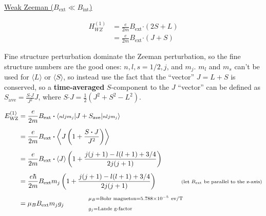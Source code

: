 \documentclass[12pt]{article}
\newcommand*{\dotP}{\boldsymbol \cdot}	%
\begin{document}
\vspace{5pt} \noindent
\underline{Weak Zeeman (\(B_\text{ext} \ll B_\text{int}\))}

\vspace{-10pt}
\begin{align*}
    H_{WZ}^{(1)} &= \frac{e}{2m} B_\text{ext} \dotP (2S + L)  \\[5pt]
    &= \frac{e}{2m} B_\text{ext} \dotP ( J + S )
\end{align*}

\vspace{5pt}\noindent
Fine structure perturbation dominate the Zeeman perturbation, so the fine structure numbers are the good ones: %
\(n,l,s{\scriptstyle=1/2},j\), and \(m_j\). \(m_l\) and \(m_s\) can't be used for \(\langle L \rangle\) or %
\(\langle S \rangle\), so instead use the fact that %
the ``vector'' \(J = L+S\) is conserved, so a \textbf{time-averaged} \(S\)-component to the \(J\) ``vector'' can be defined as %
\(S_\text{ave} = \frac{S \dotP J}{J^2} J\), where \(S \dotP J = \frac{1}{2} \left( J^2 + S^2 - L^2 \right)\).

\vspace{-10pt}
\begin{align*}
    E^{(1)}_\text{WZ} &= \frac{e}{2m} B_\text{ext} \dotP 
        \langle {\scriptstyle nljm_j} | J + S_\text{ave} | {\scriptstyle nljm_j}\rangle\\[5pt]
    &= \frac{e}{2m} B_\text{ext} \dotP 
        \left\langle J \left( 1 + \frac{S \dotP J}{J^2} \right) \right\rangle\\[5pt]
    &= \frac{e}{2m} B_\text{ext} \dotP \langle J \rangle 
        \left(1 + \frac{ j(j+1) - l(l+1) + 3/4 }{ 2 j (j+1) }\right)\\[5pt]
    &= \frac{e\hbar}{2m} B_\text{ext} m_j
        \left(1 + \frac{ j(j+1) - l(l+1) + 3/4 }{ 2 j (j+1) }\right)
        \hspace{18pt} \hspace{18pt} \text{\scriptsize(let \(B_\text{ext}\) be parallel to the z-axis)}\\[5pt]
    &= \mu_B B_\text{ext} m_j g_j \hspace{18pt} \hspace{18pt} \begin{aligned}
            &{\scriptstyle \mu_B = \text{Bohr magneton} = 5.788 \times 10^{-5} \ \text{ev/T}}\\
            &{\scriptstyle g_j = \text{Lande g-factor}}\\
        \end{aligned}
\end{align*}
\end{document}

